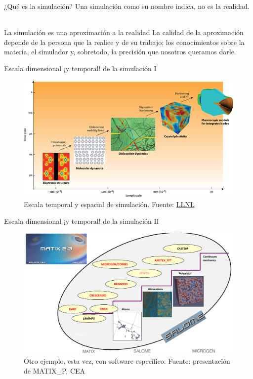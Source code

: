 \documentclass[12pt]{beamer}
\begin{document}
\begin{frame}{¿Qué es la simulación?}
	Una simulación como su nombre indica, no es la realidad. \\~
	
	\begin{block}{La simulación es una aproximación a la realidad}
		La calidad de la aproximación depende de la persona que la realice y de su trabajo; los conocimientos sobre la materia, el simulador y, sobretodo, la precisión que nosotros queramos darle.
	\end{block}	
\end{frame}

\begin{frame}{Escala dimensional ¡y temporal! de la simulación I}
	\begin{figure}
		\centering
		\includegraphics[width=1\linewidth]{ms11}
		\caption{Escala temporal y espacial de simulación. Fuente: \href{https://manufacturing.llnl.gov/content/assets/images/ms/ms11.jpg}{LLNL}}
		\label{fig:ms11}
	\end{figure}
\end{frame}

\begin{frame}{Escala dimensional ¡y temporal! de la simulación II}
	\begin{figure}
		\centering
		\includegraphics[width=1\linewidth]{cea_simulation_scale}
		\caption{Otro ejemplo, esta vez, con software específico. Fuente: presentación de MATIX\_P, CEA}
		\label{fig:ceasimulationscale}
	\end{figure}
	
\end{frame}
\end{document}
